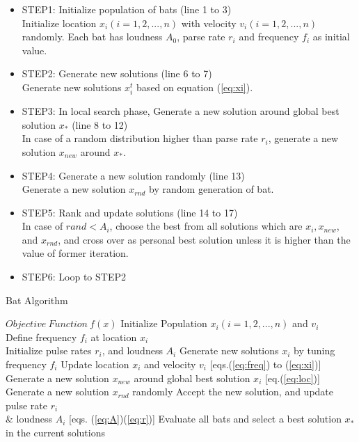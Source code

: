 \documentclass{ies2018}
\begin{document}
\begin{itemize}
\item STEP1: Initialize population of bats (line 1 to 3)\\
Initialize location ${x_i}(i=1, 2, ..., n)$ with velocity ${v_i}(i=1, 2, ..., n)$ randomly. Each bat has loudness ${A_0}$, parse rate ${r_i}$ and frequency ${f_i}$ as initial value.
\item STEP2: Generate new solutions (line 6 to 7)\\
Generate new solutions ${x_i^t}$ based on equation (\ref{eq:xi}).
\item STEP3: In local search phase, Generate a new solution around global best solution ${x_*}$ (line 8 to 12)\\
In case of a random distribution higher than parse rate ${r_i}$, generate a new solution ${x_{new}}$ around ${x_*}$.
\item STEP4: Generate a new solution randomly (line 13)\\
Generate a new solution ${x_{rnd}}$ by random generation of bat.  
\item STEP5: Rank and update solutions (line 14 to 17)\\
In case of ${rand < A_i}$, choose the best from all solutions which are ${x_i, x_{new}}$, and ${x_{rnd}}$, and cross over as personal best solution unless it is higher than the value of former iteration.  
\item STEP6: Loop to STEP2 
\end{itemize}

\begin{algorithm}[H]
\caption{Bat Algorithm}
\label{code:ba}
\begin{algorithmic}[1]
\REQUIRE $Objective\ Function\ f(x)$
\STATE Initialize Population $x_i(i=1,2,..., n)$ and $v_i$\\
\STATE Define frequency $f_i$ at location $x_i$ \\
\STATE Initialize pulse rates $r_i$, and loudness $A_i$
\STATE Generate new solutions $x_i$ by tuning frequency $f_i$
\STATE Update location $x_i$ and velocity $v_i$  [eqs.(\ref{eq:freq}) to (\ref{eq:xi})]
\STATE Generate a new solution $x_{new}$ around global best solution $x_i$ [eq.(\ref{eq:loc})] 
\ENDIF
\STATE Generate a new solution $x_{rnd}$ randomly
\STATE Accept the new solution, and update pulse rate $r_i$ \\ \& loudness $A_i$ [eqs. (\ref{eq:A})(\ref{eq:r})]  
\ENDIF
\STATE Evaluate all bats and select a best solution $x_*$ in the current solutions
\ENDFOR
\ENDWHILE
\end{algorithmic}
\end{algorithm}
\end{document}
